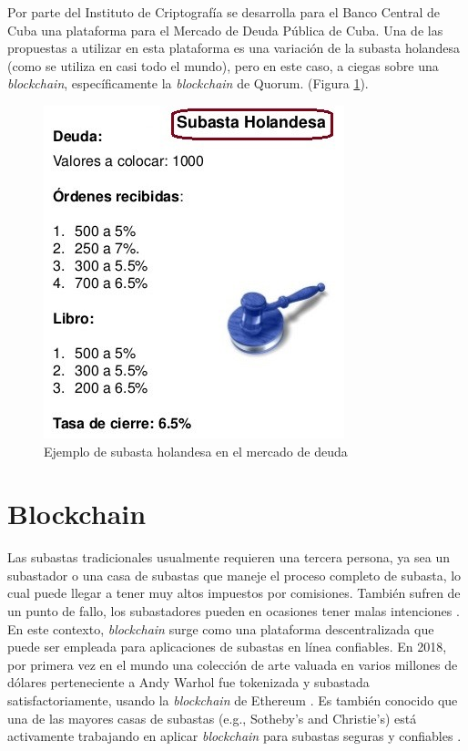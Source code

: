     Por parte del Instituto de Criptografía se desarrolla para el Banco Central de Cuba una plataforma para el Mercado de Deuda Pública de 
    Cuba. Una de las propuestas a utilizar en esta plataforma es una variación de la subasta holandesa (como se utiliza en casi todo el 
    mundo), pero en este caso, a ciegas sobre una \textit{blockchain}, específicamente la \textit{blockchain} de Quorum. (Figura 
    \ref{dutch_auction}).

    \begin{figure}[H]
      \center
      \includegraphics[scale=0.7]{Graphics/subasta-holandesa1.jpg}
      \caption{Ejemplo de subasta holandesa en el mercado de deuda}
      \label{dutch_auction}
    \end{figure}

\section{Blockchain} %
  Las subastas tradicionales usualmente requieren una tercera persona, ya sea un subastador o una 
  casa de subastas que maneje el proceso completo de subasta, lo cual puede llegar a tener muy altos
  impuestos por comisiones. También sufren de un punto de fallo, los subastadores pueden en ocasiones 
  tener malas intenciones \parencite{wu2019}. En este contexto, \textit{blockchain} surge como una plataforma descentralizada que
  puede ser empleada para aplicaciones de subastas en línea confiables. En 2018, por primera vez en el 
  mundo una colección de arte valuada en varios millones de dólares perteneciente a Andy Warhol fue tokenizada
  y subastada satisfactoriamente, usando la \textit{blockchain} de Ethereum \parencite{wood2021,emem}. Es también
  conocido que una de las mayores casas de subastas (e.g., Sotheby’s and Christie’s) está activamente
  trabajando en aplicar \textit{blockchain} para subastas seguras y confiables \parencite{neuendorf2018}. 


